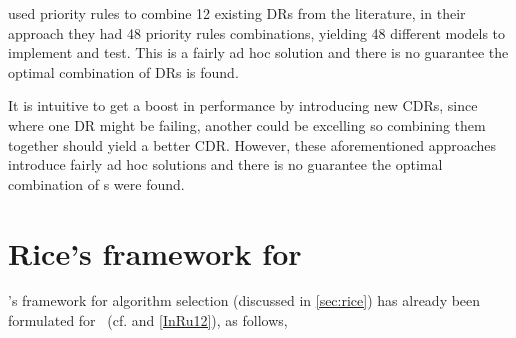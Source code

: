 \citet{Yu13} used priority rules to combine 12 existing DRs from the 
literature, in their approach they had 48 priority rules combinations, 
yielding 48 different models to implement and test. This is a fairly 
ad hoc solution and there is no guarantee the optimal combination of DRs is 
found. 

It is intuitive to get a boost in performance by introducing new CDRs, since 
where one DR might be failing, another could be excelling so combining them 
together should yield a better CDR. However, these aforementioned approaches 
introduce fairly ad hoc solutions and there is no guarantee the optimal 
combination of \dr s were found.

\section{Rice's framework for \jsp}\label{sec:rice:jsp}
\citeauthor{Rice76}'s framework for algorithm selection (discussed in 
\cref{sec:rice}) has already been formulated for \jsp\ (cf. 
\citet{SmithMilesLion3,SmithMilesLion5} and \cref{InRu12}), as follows, 
